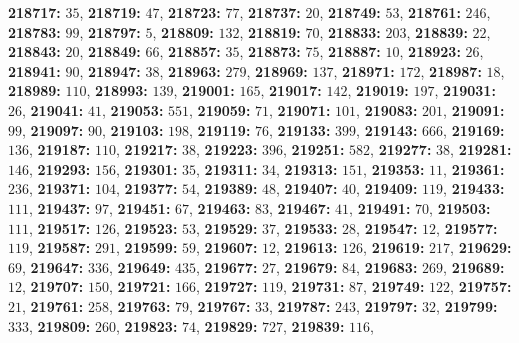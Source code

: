 \textsf{\bfseries 218717:} $35$, \textsf{\bfseries 218719:} $47$, \textsf{\bfseries 218723:} $77$, \textsf{\bfseries 218737:} $20$, \textsf{\bfseries 218749:} $53$, \textsf{\bfseries 218761:} $246$, \textsf{\bfseries 218783:} $99$, \textsf{\bfseries 218797:} $5$, \textsf{\bfseries 218809:} $132$, \textsf{\bfseries 218819:} $70$, \textsf{\bfseries 218833:} $203$, \textsf{\bfseries 218839:} $22$, \textsf{\bfseries 218843:} $20$, \textsf{\bfseries 218849:} $66$, \textsf{\bfseries 218857:} $35$, \textsf{\bfseries 218873:} $75$, \textsf{\bfseries 218887:} $10$, \textsf{\bfseries 218923:} $26$, \textsf{\bfseries 218941:} $90$, \textsf{\bfseries 218947:} $38$, \textsf{\bfseries 218963:} $279$, \textsf{\bfseries 218969:} $137$, \textsf{\bfseries 218971:} $172$, \textsf{\bfseries 218987:} $18$, \textsf{\bfseries 218989:} $110$, \textsf{\bfseries 218993:} $139$, \textsf{\bfseries 219001:} $165$, \textsf{\bfseries 219017:} $142$, \textsf{\bfseries 219019:} $197$, \textsf{\bfseries 219031:} $26$, \textsf{\bfseries 219041:} $41$, \textsf{\bfseries 219053:} $551$, \textsf{\bfseries 219059:} $71$, \textsf{\bfseries 219071:} $101$, \textsf{\bfseries 219083:} $201$, \textsf{\bfseries 219091:} $99$, \textsf{\bfseries 219097:} $90$, \textsf{\bfseries 219103:} $198$, \textsf{\bfseries 219119:} $76$, \textsf{\bfseries 219133:} $399$, \textsf{\bfseries 219143:} $666$, \textsf{\bfseries 219169:} $136$, \textsf{\bfseries 219187:} $110$, \textsf{\bfseries 219217:} $38$, \textsf{\bfseries 219223:} $396$, \textsf{\bfseries 219251:} $582$, \textsf{\bfseries 219277:} $38$, \textsf{\bfseries 219281:} $146$, \textsf{\bfseries 219293:} $156$, \textsf{\bfseries 219301:} $35$, \textsf{\bfseries 219311:} $34$, \textsf{\bfseries 219313:} $151$, \textsf{\bfseries 219353:} $11$, \textsf{\bfseries 219361:} $236$, \textsf{\bfseries 219371:} $104$, \textsf{\bfseries 219377:} $54$, \textsf{\bfseries 219389:} $48$, \textsf{\bfseries 219407:} $40$, \textsf{\bfseries 219409:} $119$, \textsf{\bfseries 219433:} $111$, \textsf{\bfseries 219437:} $97$, \textsf{\bfseries 219451:} $67$, \textsf{\bfseries 219463:} $83$, \textsf{\bfseries 219467:} $41$, \textsf{\bfseries 219491:} $70$, \textsf{\bfseries 219503:} $111$, \textsf{\bfseries 219517:} $126$, \textsf{\bfseries 219523:} $53$, \textsf{\bfseries 219529:} $37$, \textsf{\bfseries 219533:} $28$, \textsf{\bfseries 219547:} $12$, \textsf{\bfseries 219577:} $119$, \textsf{\bfseries 219587:} $291$, \textsf{\bfseries 219599:} $59$, \textsf{\bfseries 219607:} $12$, \textsf{\bfseries 219613:} $126$, \textsf{\bfseries 219619:} $217$, \textsf{\bfseries 219629:} $69$, \textsf{\bfseries 219647:} $336$, \textsf{\bfseries 219649:} $435$, \textsf{\bfseries 219677:} $27$, \textsf{\bfseries 219679:} $84$, \textsf{\bfseries 219683:} $269$, \textsf{\bfseries 219689:} $12$, \textsf{\bfseries 219707:} $150$, \textsf{\bfseries 219721:} $166$, \textsf{\bfseries 219727:} $119$, \textsf{\bfseries 219731:} $87$, \textsf{\bfseries 219749:} $122$, \textsf{\bfseries 219757:} $21$, \textsf{\bfseries 219761:} $258$, \textsf{\bfseries 219763:} $79$, \textsf{\bfseries 219767:} $33$, \textsf{\bfseries 219787:} $243$, \textsf{\bfseries 219797:} $32$, \textsf{\bfseries 219799:} $333$, \textsf{\bfseries 219809:} $260$, \textsf{\bfseries 219823:} $74$, \textsf{\bfseries 219829:} $727$, \textsf{\bfseries 219839:} $116$, 
